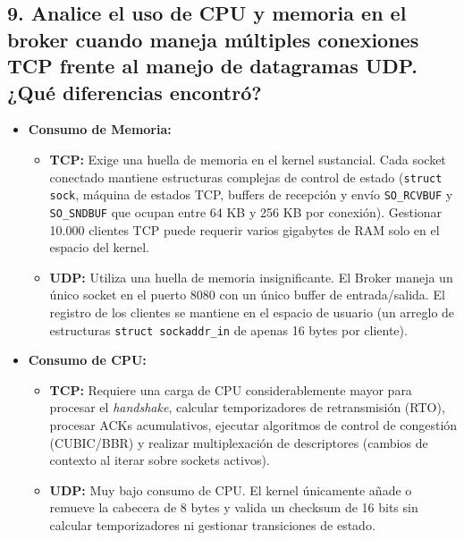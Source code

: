 \documentclass[11pt,a4paper]{article}
\begin{document}
\subsection{9. Analice el uso de CPU y memoria en el broker cuando maneja múltiples conexiones TCP frente al manejo de datagramas UDP. ¿Qué diferencias encontró?}
\begin{itemize}
    \item \textbf{Consumo de Memoria:}
    \begin{itemize}
        \item \textbf{TCP:} Exige una huella de memoria en el kernel sustancial. Cada socket conectado mantiene estructuras complejas de control de estado (\texttt{struct sock}, máquina de estados TCP, buffers de recepción y envío \texttt{SO\_RCVBUF} y \texttt{SO\_SNDBUF} que ocupan entre 64 KB y 256 KB por conexión). Gestionar 10.000 clientes TCP puede requerir varios gigabytes de RAM solo en el espacio del kernel.
        \item \textbf{UDP:} Utiliza una huella de memoria insignificante. El Broker maneja un único socket en el puerto 8080 con un único buffer de entrada/salida. El registro de los clientes se mantiene en el espacio de usuario (un arreglo de estructuras \texttt{struct sockaddr\_in} de apenas 16 bytes por cliente).
    \end{itemize}
    \item \textbf{Consumo de CPU:}
    \begin{itemize}
        \item \textbf{TCP:} Requiere una carga de CPU considerablemente mayor para procesar el \textit{handshake}, calcular temporizadores de retransmisión (RTO), procesar ACKs acumulativos, ejecutar algoritmos de control de congestión (CUBIC/BBR) y realizar multiplexación de descriptores (cambios de contexto al iterar sobre sockets activos).
        \item \textbf{UDP:} Muy bajo consumo de CPU. El kernel únicamente añade o remueve la cabecera de 8 bytes y valida un checksum de 16 bits sin calcular temporizadores ni gestionar transiciones de estado.
    \end{itemize}
\end{itemize}
\end{document}
